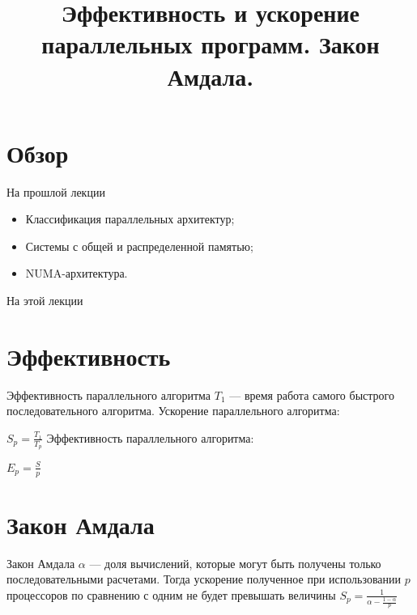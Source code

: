 

\title{Эффективность и ускорение параллельных программ. Закон Амдала.}



\begin{frame}
\titlepage
\end{frame}

\section*{Обзор}

\begin{frame}{На прошлой лекции}
\begin{itemize}
\ifsbertech
    \item Классификация параллельных архитектур;
    \item Системы с общей и распределенной памятью;
    \item NUMA-архитектура.
\fi
\end{itemize}
\end{frame}

\begin{frame}{На этой лекции}
\tableofcontents
\end{frame}

\section{Эффективность}

\begin{frame}{Эффективность параллельного алгоритма}
$T_1$ --- время работа самого быстрого последовательного алгоритма.
\vfill
Ускорение параллельного алгоритма:

$S_p = \frac{T_1}{T_p}$
\vfill
Эффективность параллельного алгоритма:

$E_p = \frac{S}{p}$
\end{frame}

\section{Закон Амдала}

\begin{frame}{Закон Амдала}
$\alpha$ --- доля вычислений, которые могут быть получены только
последовательными расчетами.
\vfill
Тогда ускорение полученное при использовании $p$ процессоров по сравнению с
одним не будет превышать величины
\vfill
$S_p =\frac{1}{\alpha - \frac{1 - \alpha}{p}}$
\end{frame}

